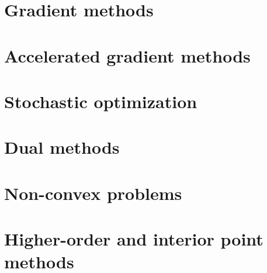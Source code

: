 \documentclass[11pt]{article}
\begin{document}
\maketitle



\pagebreak

\setcounter{tocdepth}{2}
\tableofcontents

\pagebreak

\part{Gradient methods}
\label{part:basic}





\part{Accelerated gradient methods}
\label{part:accelerated}




\part{Stochastic optimization}
\label{part:stochastic}



\part{Dual methods}
\label{part:dual}




\part{Non-convex problems}
\label{part:nonconvex}





\part{Higher-order and interior point methods}
\label{part:higher}







\end{document}
